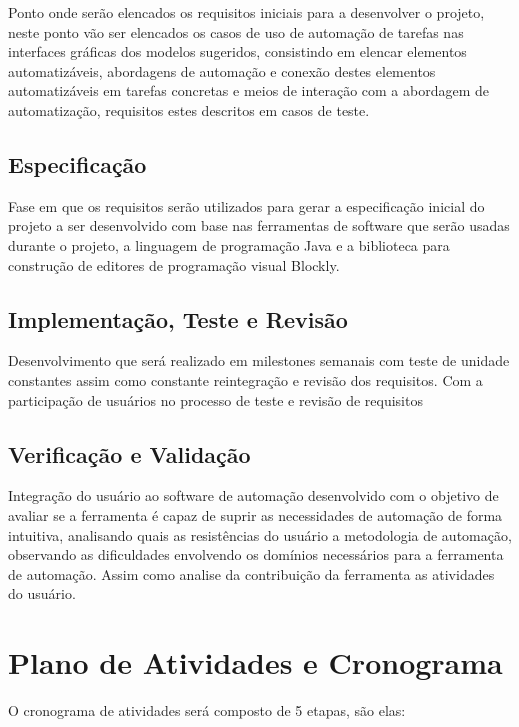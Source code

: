 \documentclass[12pt]{article}
\begin{document}
	 Ponto onde serão elencados os requisitos iniciais para a desenvolver o projeto, neste ponto vão ser elencados os casos de uso de automação de tarefas nas interfaces gráficas dos modelos sugeridos, consistindo em elencar elementos automatizáveis, abordagens de automação e conexão destes elementos automatizáveis em tarefas concretas e meios de interação com a abordagem de automatização, requisitos estes descritos em casos de teste.
	
	\subsection{Especificação}
	Fase em que os requisitos serão utilizados para gerar a especificação inicial do projeto a ser desenvolvido com base nas ferramentas de software que serão usadas durante o projeto, a linguagem de programação Java e a biblioteca para construção de editores de programação visual Blockly.
	
	
	\subsection{Implementação, Teste e Revisão}
	
	Desenvolvimento que será realizado em milestones semanais com teste de unidade constantes assim como constante reintegração e revisão dos requisitos. Com a participação de usuários no processo de teste e revisão de requisitos     
    
    
    \subsection{Verificação e Validação}
    
    Integração do usuário ao software de automação desenvolvido com o objetivo de avaliar se a ferramenta é capaz de suprir as necessidades de automação de forma intuitiva, analisando quais as resistências do usuário a metodologia de automação, observando as dificuldades envolvendo os domínios necessários para a ferramenta de automação. Assim como analise da contribuição da ferramenta as atividades do usuário. 

	\section{Plano de Atividades e Cronograma}
	
	O cronograma de atividades será composto de 5 etapas, são elas:
	
\end{document}
